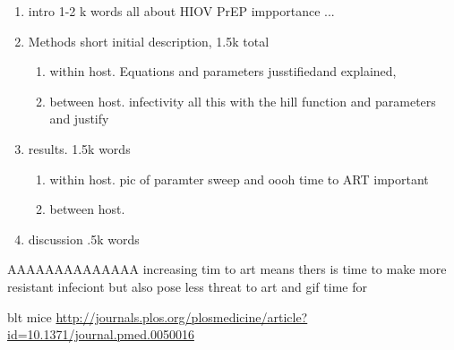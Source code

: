 \documentclass[DIV=15]{scrartcl}
\begin{document}
\begin{enumerate}
\item intro 1-2 k words all about HIOV PrEP impportance ...
\item Methods short initial description, 1.5k total
\begin{enumerate}
\item within host. Equations and parameters jusstifiedand explained,

\item between host. infectivity all  this with the hill function and parameters and justify 



\end{enumerate}

\item results. 1.5k words
\begin{enumerate}
\item within host.  pic of paramter sweep and oooh time  to ART important 


\item between host. 

\end{enumerate}
\item discussion .5k words
\end{enumerate} 
 
 
 
 
 AAAAAAAAAAAAAA
   increasing tim to art means thers is time to make more resistant infeciont but also pose less threat to art and gif time for 
   
   
   blt mice \url{http://journals.plos.org/plosmedicine/article?id=10.1371/journal.pmed.0050016}
 
 
 \fi
 
 

 


 
\end{document}
